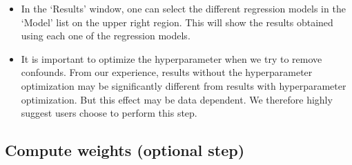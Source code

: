 \begin{itemize}
	
   \item In the `Results' window, one can select the different regression models in the `Model' list on the upper right region. This will show the results obtained using each one of the regression models.

   \item It is important to optimize the hyperparameter when we try to remove confounds. From our experience, results without the hyperparameter optimization may be significantly different from results with hyperparameter optimization. But this effect may be data dependent. We therefore highly suggest users choose to perform this step. 

\end{itemize}



\subsection{Compute weights (optional step)}

